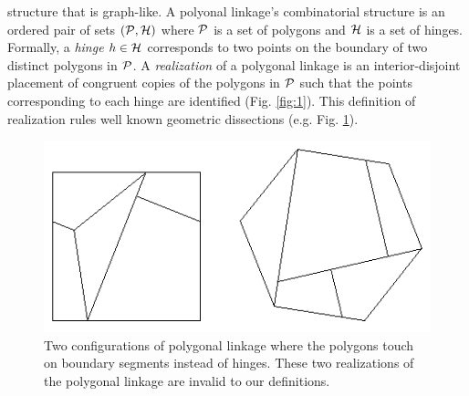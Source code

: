 structure that is graph-like.  A polyonal linkage's combinatorial structure is an ordered pair of 
sets $\left({\cal P},{\cal H} \right)$ where ${\cal P}$ is a set of polygons and ${\cal H}$ is a set of hinges.  
Formally, a \textit{hinge} $h\in {\cal H}$ 
corresponds to two points on the boundary of two distinct polygons in ${\cal P}$.  A \emph{realization} 
of a polygonal linkage is an interior-disjoint placement of 
congruent copies of the polygons in ${\cal P}$ such that the points corresponding to each hinge are 
identified (Fig. \ref{fig:1}). This definition of realization rules well known geometric 
dissections (e.g. Fig. \ref{fig:polygonallinkage-4}).
\begin{figure}[h]
\begin{center}
\includegraphics[scale=.25]{graphics/polygonaldissection.png}
\end{center}
\caption{Two configurations of polygonal linkage where the polygons touch on boundary segments 
instead of hinges.  These two realizations of the polygonal linkage are invalid to our definitions. 
 }
\label{fig:polygonallinkage-4}
\end{figure}




